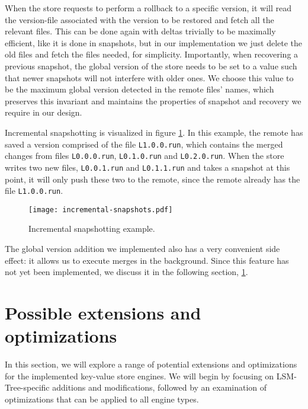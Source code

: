 When the store requests to perform a rollback to a specific version, it will read the version-file associated with the version to be restored and fetch all the relevant files. This can be done again with deltas trivially to be maximally efficient, like it is done in snapshots, but in our implementation we just delete the old files and fetch the files needed, for simplicity. Importantly, when recovering a previous snapshot, the global version of the store needs to be set to a value such that newer snapshots will not interfere with older ones. We choose this value to be the maximum global version detected in the remote files' names, which preserves this invariant and maintains the properties of snapshot and recovery we require in our design.

Incremental snapshotting is visualized in figure \ref{fig:incremental-snapshots}. In this example, the remote has saved a version comprised of the file \verb|L1.0.0.run|, which contains the merged changes from files \verb|L0.0.0.run|, \verb|L0.1.0.run| and \verb|L0.2.0.run|. When the store writes two new files, \verb|L0.0.1.run| and \verb|L0.1.1.run| and takes a snapshot at this point, it will only push these two to the remote, since the remote already has the file \verb|L1.0.0.run|.

\vspace{20px}
\begin{figure}[h]
    \centering
    \texttt{[image: incremental-snapshots.pdf]}
    \caption{Incremental snapshotting example.}
    \label{fig:incremental-snapshots}
\end{figure}
\vspace{20px}

The global version addition we implemented also has a very convenient side effect: it allows us to execute merges in the background. Since this feature has not yet been implemented, we discuss it in the following section, \ref{section-extensions}.

\section{Possible extensions and optimizations}
\label{section-extensions}

In this section, we will explore a range of potential extensions and optimizations for the implemented key-value store engines. We will begin by focusing on LSM-Tree-specific additions and modifications, followed by an examination of optimizations that can be applied to all engine types.

